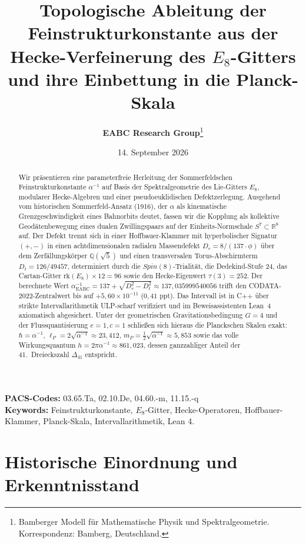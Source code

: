 \documentclass[11pt,a4paper]{article}
\title{\textbf{Topologische Ableitung der Feinstrukturkonstante aus der Hecke-Verfeinerung des $E_8$-Gitters und ihre Einbettung in die Planck-Skala}}
\author{\textbf{EABC Research Group}\thanks{Bamberger Modell für Mathematische Physik und Spektralgeometrie. Korrespondenz: Bamberg, Deutschland.}}
\date{14. September 2026}
\begin{document}
\maketitle

\begin{abstract}
Wir präsentieren eine parameterfreie Herleitung der Sommerfeldschen Feinstrukturkonstante $\alpha^{-1}$ auf Basis der Spektralgeometrie des Lie-Gitters $E_8$, modularer Hecke-Algebren und einer pseudoeuklidischen Defektzerlegung. 
Ausgehend vom historischen Sommerfeld-Ansatz (1916), der $\alpha$ als kinematische Grenzgeschwindigkeit eines Bahnorbits deutet, fassen wir die Kopplung als kollektive Geodätenbewegung eines dualen Zwillingspaars auf der Einheits-Normschale $S^7 \subset \mathbb{R}^8$ auf. 
Der Defekt trennt sich in einer Hoffbauer-Klammer mit hyperbolischer Signatur $(+,-)$ in einen achtdimensionalen radialen Massendefekt $D_r = 8 / (137 \cdot \phi)$ über dem Zerfällungskörper $\mathbb{Q}(\sqrt{5})$ und einen transversalen Torus-Abschirmterm $D_t = 126 / 49457$, determiniert durch die $Spin(8)$-Trialität, die Dedekind-Stufe $24$, das Cartan-Gitter $\mathrm{rk}(E_8)\times 12 = 96$ sowie den Hecke-Eigenwert $\tau(3) = 252$.
Der berechnete Wert $\alpha^{-1}_{\mathrm{EABC}} = 137 + \sqrt{D_r^2 - D_t^2} \approx 137{,}035999540056$ trifft den CODATA-2022-Zentralwert bis auf $+5{,}60 \times 10^{-11}$ ($0{,}41\text{ ppt}$).
Das Intervall ist in C++ über strikte Intervallarithmetik ULP-scharf verifiziert und im Beweisassistenten Lean~4 axiomatisch abgesichert. 
Unter der geometrischen Gravitationsbedingung $G = 4$ und der Flussquantisierung $e=1, c=1$ schließen sich hieraus die Planckschen Skalen exakt: $\hbar = \alpha^{-1}$, $\ell_P = 2\sqrt{\alpha^{-1}} \approx 23{,}412$, $m_P = \frac{1}{2}\sqrt{\alpha^{-1}} \approx 5{,}853$ sowie das volle Wirkungsquantum $h = 2\pi\alpha^{-1} \approx 861{,}023$, dessen ganzzahliger Anteil der 41.~Dreieckszahl $\Delta_{41}$ entspricht.
\end{abstract}

\vspace{0.5cm}
\noindent\textbf{PACS-Codes:} 03.65.Ta, 02.10.De, 04.60.-m, 11.15.-q \\
\textbf{Keywords:} Feinstrukturkonstante, $E_8$-Gitter, Hecke-Operatoren, Hoffbauer-Klammer, Planck-Skala, Intervallarithmetik, Lean 4.

\newpage

\section{Historische Einordnung und Erkenntnisstand}
\end{document}
